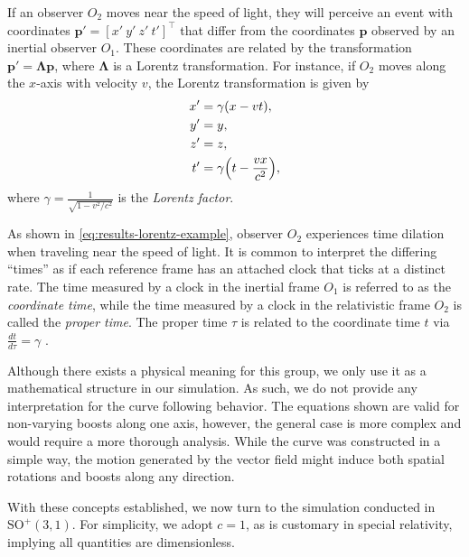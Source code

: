 If an observer $O_2$ moves near the speed of light, they will perceive an event with coordinates $\mathbf{p}' = [x'\ y'\ z'\ t']^\top$ that differ from the coordinates $\mathbf{p}$ observed by an inertial observer $O_1$. These coordinates are related by the transformation $\mathbf{p}' = \boldsymbol{\Lambda} \mathbf{p}$, where $\boldsymbol{\Lambda}$ is a Lorentz transformation. For instance, if $O_2$ moves along the $x$-axis with velocity $v$, the Lorentz transformation is given by
\begin{align}
   \begin{split}
     x' &= \gamma(x - vt),\\
     y' &= y,\\
     z'&=z,\\
     t' &= \gamma\Bigl(t - \frac{vx}{c^2}\Bigr),\label{eq:results-lorentz-example}
   \end{split}
\end{align}
where $\gamma = \frac{1}{\sqrt{1 - v^2/c^2}}$ is the \emph{Lorentz factor}.

As shown in \eqref{eq:results-lorentz-example}, observer $O_2$ experiences time dilation when traveling near the speed of light. It is common to interpret the differing ``times'' as if each reference frame has an attached clock that ticks at a distinct rate. The time measured by a clock in the inertial frame $O_1$ is referred to as the \emph{coordinate time}, while the time measured by a clock in the relativistic frame $O_2$ is called the \emph{proper time}. The proper time $\tau$ is related to the coordinate time $t$ via $\frac{dt}{d\tau} = \gamma$ \citep[p. 32]{steane2012relativity}.

Although there exists a physical meaning for this group, we only use it as a mathematical structure in our simulation. As such, we do not provide any interpretation for the curve following behavior. The equations shown are valid for non-varying boosts along one axis, however, the general case is more complex and would require a more thorough analysis. While the curve was constructed in a simple way, the motion generated by the vector field might induce both spatial rotations and boosts along any direction.

With these concepts established, we now turn to the simulation conducted in $\text{SO}^+(3, 1)$. For simplicity, we adopt $c = 1$, as is customary in special relativity, implying all quantities are dimensionless.

